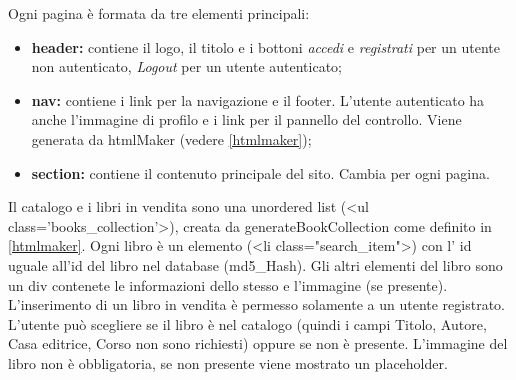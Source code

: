 Ogni pagina è formata da tre elementi principali:
\begin{itemize}
    \item \textbf{header:} contiene il logo, il titolo e i bottoni \textit{accedi} e \textit{registrati} per un utente non autenticato, \textit{Logout} per un utente autenticato;
    \item \textbf{nav:} contiene i link per la navigazione e il footer. L'utente autenticato ha anche l'immagine di profilo e i link per il pannello del controllo. Viene generata da htmlMaker (vedere \ref{htmlmaker});
    \item \textbf{section:} contiene il contenuto principale del sito. Cambia per ogni pagina.
\end{itemize}
Il catalogo e i libri in vendita sono una unordered list (<ul class='books\_collection'>), creata da generateBookCollection come definito in \ref{htmlmaker}. Ogni libro è un elemento (<li class="search\_item">) con l' id uguale all'id del libro nel database (md5\_Hash). Gli altri elementi del libro sono un div contenete le informazioni dello stesso e l'immagine (se presente).\\
L'inserimento di un libro in vendita è permesso solamente a un utente registrato. L'utente può scegliere se il libro è nel catalogo (quindi i campi Titolo, Autore, Casa editrice, Corso non sono richiesti) oppure se non è presente. L'immagine del libro non è obbligatoria, se non presente viene mostrato un placeholder.
